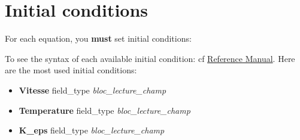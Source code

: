     \begin{center}
    \end{center}






\section{Initial conditions}
For each equation, you \textbf{must} set initial conditions:
\begin{center}
\end{center}

To see the syntax of each available initial condition: cf \href{\REFERENCEMANUAL\#condinits}{\trustref Reference Manual}.
Here are the most used initial conditions:
\begin{itemize}
\item \textbf{Vitesse}     field\_type   \textit{bloc\_lecture\_champ}
\item \textbf{Temperature}  field\_type   \textit{bloc\_lecture\_champ}
\item \textbf{K\_eps}       field\_type   \textit{bloc\_lecture\_champ}
\end{itemize}

